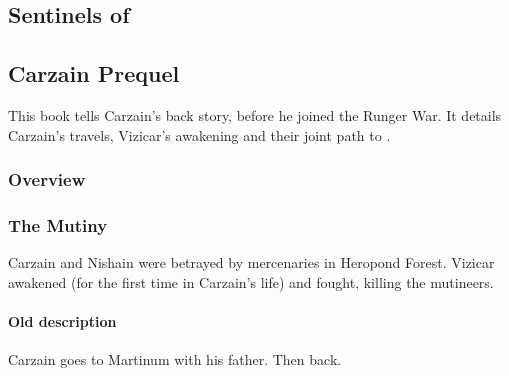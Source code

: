 \begin{garbage}
\part{Sentinels of \Miith}























\chapter{Carzain Prequel}
This book tells Carzain's back story, before he joined the Runger War. 
It details Carzain's travels, Vizicar's awakening and their joint path to \kenosis. 















\section{Overview}















\section{The Mutiny}
Carzain and Nishain were betrayed by mercenaries in Heropond Forest. 
Vizicar awakened (for the first time in Carzain's life) and fought, killing the mutineers. 









\subsection{Old description}
Carzain goes to Martinum with his father. Then back.


\end{garbage}
